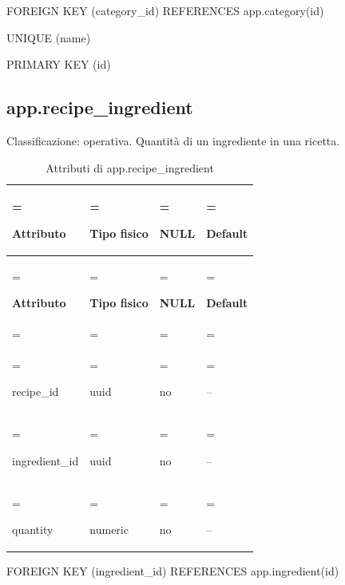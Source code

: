 \documentclass[11pt,a4paper]{article}
\begin{document}
{\ttfamily\small FOREIGN KEY (\allowbreak{}category\_\allowbreak{}id) REFERENCES app.\allowbreak{}category(\allowbreak{}id)}\par

{\ttfamily\small UNIQUE (\allowbreak{}name)}\par

{\ttfamily\small PRIMARY KEY (\allowbreak{}id)}\par

\subsection{app.recipe\_ingredient}

Classificazione: operativa. Quantità di un ingrediente in una ricetta.

{\small \renewcommand{\arraystretch}{1.2}

\begin{xltabular}{\linewidth}{>{\hsize\linewidth=\hsize\raggedright\arraybackslash}X>{\hsize\linewidth=\hsize\raggedright\arraybackslash}X>{\hsize\linewidth=\hsize\raggedright\arraybackslash}X>{\hsize\linewidth=\hsize\raggedright\arraybackslash}X}
\caption{Attributi di app.recipe\_ingredient}\label{tab:dictionary-20}\\
\toprule

\textbf{Attributo} & \textbf{Tipo fisico} & \textbf{NULL} & \textbf{Default}\\\midrule\endfirsthead\toprule\textbf{Attributo} & \textbf{Tipo fisico} & \textbf{NULL} & \textbf{Default}\\\midrule\endhead
\midrule{}\\\endfoot\bottomrule\endlastfoot


{\ttfamily\small recipe\_\allowbreak{}id} & {\ttfamily\small uuid} & no & {\ttfamily\small --}\\\addlinespace[3pt]

{\ttfamily\small ingredient\_\allowbreak{}id} & {\ttfamily\small uuid} & no & {\ttfamily\small --}\\\addlinespace[3pt]

{\ttfamily\small quantity} & {\ttfamily\small numeric} & no & {\ttfamily\small --}\\*

\end{xltabular}}

{\ttfamily\small FOREIGN KEY (\allowbreak{}ingredient\_\allowbreak{}id) REFERENCES app.\allowbreak{}ingredient(\allowbreak{}id)}\par
\end{document}
